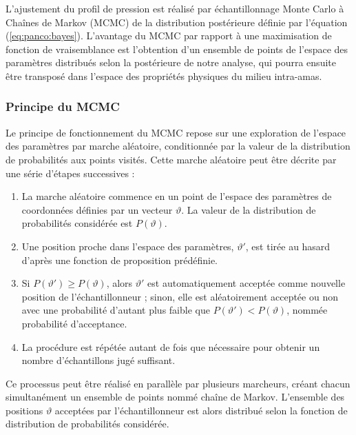 L'ajustement du profil de pression est réalisé par échantillonnage Monte Carlo à Chaînes de Markov (MCMC) de la distribution postérieure définie par l'équation (\ref{eq:panco:bayes}).
L'avantage du MCMC par rapport à une maximisation de fonction de vraisemblance est l'obtention d'un ensemble de points de l'espace des paramètres distribués selon la postérieure de notre analyse, qui pourra ensuite être transposé dans l'espace des propriétés physiques du milieu intra-amas.

\subsubsection{Principe du MCMC} %
Le principe de fonctionnement du MCMC repose sur une exploration de l'espace des paramètres par marche aléatoire, conditionnée par la valeur de la distribution de probabilités aux points visités.
Cette marche aléatoire peut être décrite par une série d'étapes successives :

\begin{enumerate}[leftmargin=*]
    \item La marche aléatoire commence en un point de l'espace des paramètres de coordonnées définies par un vecteur $\vartheta$.
        La valeur de la distribution de probabilités considérée est $P(\vartheta)$.
    \item Une position proche dans l'espace des paramètres, $\vartheta'$, est tirée au hasard d'après une fonction de proposition prédéfinie.
    \item Si $P(\vartheta') \geqslant P(\vartheta)$, alors $\vartheta'$ est automatiquement acceptée comme nouvelle position de l'échantillonneur ; sinon, elle est aléatoirement acceptée ou non avec une probabilité d'autant plus faible que $P(\vartheta') < P(\vartheta)$, nommée probabilité d'acceptance.
    \item La procédure est répétée autant de fois que nécessaire pour obtenir un nombre d'échantillons jugé suffisant.
\end{enumerate}

Ce processus peut être réalisé en parallèle par plusieurs marcheurs, créant chacun simultanément un ensemble de points nommé chaîne de Markov.
L'ensemble des positions $\vartheta$ acceptées par l'échantillonneur est alors distribué selon la fonction de distribution de probabilités considérée.

